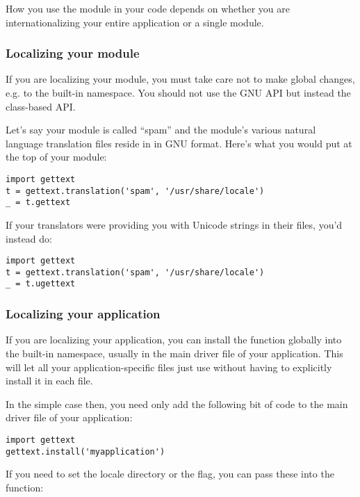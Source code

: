 How you use the  module in your code depends on
whether you are internationalizing your entire application or a single
module.

\subsubsection{Localizing your module}

If you are localizing your module, you must take care not to make
global changes, e.g. to the built-in namespace.  You should not use
the GNU  API but instead the class-based API.  

Let's say your module is called ``spam'' and the module's various
natural language translation  files reside in
 in GNU  format.  Here's what
you would put at the top of your module:

\begin{verbatim}
import gettext
t = gettext.translation('spam', '/usr/share/locale')
_ = t.gettext
\end{verbatim}

If your translators were providing you with Unicode strings in their
 files, you'd instead do:

\begin{verbatim}
import gettext
t = gettext.translation('spam', '/usr/share/locale')
_ = t.ugettext
\end{verbatim}

\subsubsection{Localizing your application}

If you are localizing your application, you can install the \function{_()}
function globally into the built-in namespace, usually in the main driver file
of your application.  This will let all your application-specific
files just use  without having to explicitly install it in
each file.

In the simple case then, you need only add the following bit of code
to the main driver file of your application:

\begin{verbatim}
import gettext
gettext.install('myapplication')
\end{verbatim}

If you need to set the locale directory or the  flag,
you can pass these into the  function:

